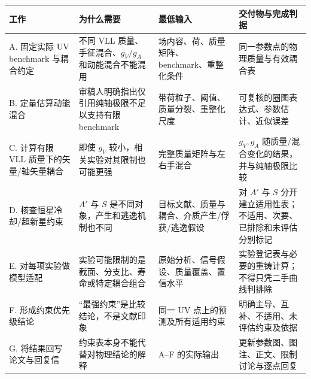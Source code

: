 \documentclass[
  chinese,
  UTF8]{ctexart}
\newcounter{none} %
\begin{document}
{\def\LTcaptype{none} %
\begin{longtable}[]{@{}
  >{\raggedright\arraybackslash}p{}
  >{\raggedright\arraybackslash}p{}
  >{\raggedright\arraybackslash}p{}
  >{\raggedright\arraybackslash}p{}@{}}
\toprule\noalign{}
\begin{minipage}[b]{\linewidth}\raggedright
工作
\end{minipage} & \begin{minipage}[b]{\linewidth}\raggedright
为什么需要
\end{minipage} & \begin{minipage}[b]{\linewidth}\raggedright
最低输入
\end{minipage} & \begin{minipage}[b]{\linewidth}\raggedright
交付物与完成判据
\end{minipage} \\
\midrule\noalign{}
\endhead
\bottomrule\noalign{}
\endlastfoot
A. 固定实际 UV benchmark 与耦合约定 & 不同 VLL
质量、手征混合、\(g_V/g_A\) 和动能混合不能混用 &
场内容、荷、质量矩阵、benchmark、重整化条件 &
同一参数点的物理质量与有效耦合表 \\
B. 定量估算动能混合 & 审稿人明确指出仅引用纯轴极限不足以支持有限
benchmark & 带荷粒子、阈值、质量分裂、重整化尺度 &
可复核的圈图表达式、参数估计、近似误差 \\
C. 计算有限 VLL 质量下的矢量/轴矢量耦合 & 即使 \(g_V\)
较小，相关实验对其限制也可能更强 & 完整质量矩阵与左右手混合 &
\(g_V,g_A\) 随质量/混合变化的结果，并与纯轴极限比较 \\
D. 核查恒星冷却/超新星约束 & \(A'\) 与 \(S\)
是不同对象，产生和逃逸机制也不同 &
目标文献、质量与耦合、介质产生/俘获/逃逸假设 & 对 \(A'\) 与 \(S\)
分开建立适用性表；不适用、次要、已排除和未评估分别标记 \\
E. 对每项实验做模型适配 &
实验可能限制的是截面、分支比、寿命或特定耦合组合 &
原始分析、信号假设、质量覆盖、置信水平 &
实验登记表与必要的重铸计算；不得只凭二手曲线判排除 \\
F. 形成约束优先级结论 & ``最强约束''是比较结论，不是文献印象 & 同一 UV
点上的预测及所有适用约束 & 明确主导、互补、不适用、未评估约束及依据 \\
G. 将结果回写论文与回复信 & 约束表本身不能代替对物理结论的解释 & A--F
的实际输出 & 更新参数图、图注、正文、限制讨论与逐点回复 \\
\end{longtable}
}
\end{document}
